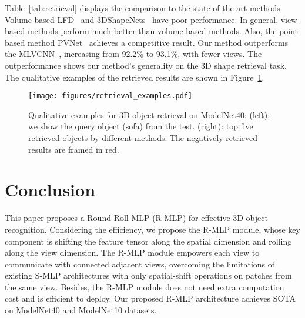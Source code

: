 \documentclass[11pt]{article}
\begin{document}
Table~\ref{tab:retrieval} displays the comparison to the state-of-the-art methods. Volume-based LFD~\citep{chen2003visual} and 3DShapeNets~\citep{chang2015shapenet} have poor performance. In general, view-based methods perform much better than volume-based methods. Also, the point-based method PVNet~\citep{you2018pvnet} achieves a competitive result. Our method outperforms the  MLVCNN~\citep{jiang2019mlvcnn}, increasing from 92.2\% to 93.1\%, with fewer views. The outperformance shows our method's generality on the 3D shape retrieval task.
The qualitative examples of the retrieved results are shown in Figure~\ref{fig:retr}.

\begin{figure}[htb!]
\centering
\texttt{[image: figures/retrieval\_examples.pdf]}
\caption{
Qualitative examples for 3D object retrieval on ModelNet40: (left): we show the query object (sofa) from the test. (right): top five retrieved objects by different methods.
The negatively retrieved results are framed in red.
}
\label{fig:retr}\vspace{0.5in}
\end{figure}




\section{Conclusion}
This paper proposes a Round-Roll MLP (R-MLP) for effective 3D object recognition. Considering the efficiency, we propose the R-MLP module, whose key component is shifting the feature tensor along the spatial dimension and rolling along the view dimension. The R-MLP module empowers each view to communicate with connected adjacent views, overcoming the limitations of existing S-MLP architectures with only spatial-shift operations on patches from the same view. Besides, the R-MLP module does not need extra computation cost and is efficient to deploy. Our proposed R-MLP architecture achieves SOTA on ModelNet40 and ModelNet10 datasets.




\end{document}
